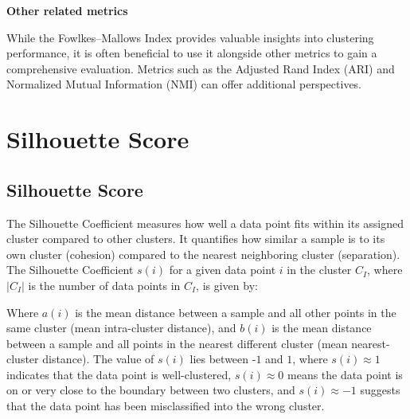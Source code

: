 \textbf{Other related metrics}

While the Fowlkes–Mallows Index provides valuable insights into clustering performance, it is often beneficial to use it
alongside other metrics to gain a comprehensive evaluation. Metrics such as the Adjusted Rand Index (ARI) and Normalized Mutual
Information (NMI) can offer additional perspectives.


\clearpage
\thispagestyle{clusteringstyle}
\section{Silhouette Score}
\subsection{Silhouette Score}

The Silhouette Coefficient measures how well a data point fits within its assigned cluster compared to other clusters. 
It quantifies how similar a sample is to its own cluster (cohesion) compared to the nearest neighboring cluster (separation).
The Silhouette Coefficient $s(i)$ for a given data point $i$ in the cluster $C_I$, where $|C_I|$ is the number of data points in $C_I$, is given by:

\begin{center}
\end{center}

Where  $a(i)$ is the mean distance between a sample and all other points in the same cluster (mean intra-cluster distance), 
and  $b(i)$ is the mean distance between a sample and all points in the nearest different cluster (mean nearest-cluster distance). 
The value of  $s(i)$ lies between -$1$ and  $1$, where  $s(i) \approx 1$ indicates that the data point is well-clustered, 
 $s(i) \approx 0$ means the data point is on or very close to the boundary between two clusters, and  $s(i) \approx -1$ 
suggests that the data point has been misclassified into the wrong cluster.

